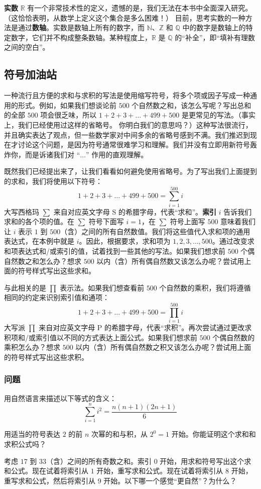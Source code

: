\textbf{实数} $\mathbb{R}$ 有一个非常技术性的定义，遗憾的是，我们无法在本书中全面深入研究。（这恰恰表明，从数学上定义这个集合是多么困难！） 目前，思考实数的一种方法是通过\textbf{数轴}。实数是数轴上所有的数字，而 $\mathbb{N}$、$\mathbb{Z}$ 和 $\mathbb{Q}$ 中的数字是数轴上的特定数字，它们并不构成整条数轴。某种程度上，$\mathbb{R}$ 是 $\mathbb{Q}$ 的“补全”，即“填补有理数之间的空白”。

\subsection{符号加油站}\label{sec:section1.3.5}

一种流行且方便的求和与求积的写法是使用缩写符号，将多个项或因子写成一种通用的形式。例如，如果我们想谈论前 $500$ 个自然数之和，该怎么写呢？写出总和的全部 $500$ 项会很乏味，所以 $1+2+3+\dots+499+500$ 是更常见的写法。（事实上，我们已经使用过这样的省略号。 你明白我们的意思吗？）这种写法很流行，并且确实表达了观点，但一些数学家对中间多余的省略号感到不满。我们推迟到现在才讨论这个问题，是因为符号通常很难学习和理解。我们并没有立即用新符号轰炸你，而是诉诸我们对 “$\dots$” 作用的直观理解。

既然我们已经提出来了，让我们看看如何避免使用省略号。为了写出我们上面提到的求和，我们将使用以下符号：
\[1+2+3+\dots+499+500 = \sum_{i=1}^{500}i\]
大写西格玛 $\sum$ 来自对应英文字母 S 的希腊字母，代表“求和”。\textbf{索引} $i$ 告诉我们求和的各个项的值。在 $\sum$ 符号下面写 $i = 1$，在 $\sum$ 符号上面写 $500$ 意味着我们让 $i$ 表示 $1$ 到 $500$（含）之间的所有自然数值。我们将这些值代入求和项的通用表达式，在本例中就是 $i$。因此，根据要求，求和项为 $1,2,3,\dots,500$。通过改变求和项表达式和/或索引的值，试着找到一些其他的写法。如果我们想求前 $500$ 个偶自然数之和怎么办？想求 $500$ 以内（含）所有偶自然数又该怎么办呢？尝试用上面的符号样式写出这些求和。

与此相关的是 $\prod$ 表示法。如果我们想查看前 $500$ 个自然数的乘积，我们将遵循相同的约定来识别索引值和通项：
\[1+2+3+\dots+499+500 = \prod_{i=1}^{500}i\]
大写派 $\prod$ 来自对应英文字母 P 的希腊字母，代表“求积”。再次尝试通过更改求积项和/或索引值以不同的方式表达上面公式。如果我们想求前 $500$ 个偶自然数的乘积怎么办？想求 $500$ 以内（含）所有偶自然数之积又该怎么办呢？尝试用上面的符号样式写出这些求积。

\subsubsection*{问题}

\begin{problem}
    用自然语言来描述以下等式的含义：
    \[\sum_{i=1}^{n}i^2 = \frac{n(n+1)(2n+1)}{6}\]
\end{problem}
\begin{problem}
    用适当的符号表达 $2$ 的前 $n$ 次幂的和与积，从 $2^0=1$ 开始。你能证明这个求和和求积公式吗？
\end{problem}
\begin{problem}
    考虑 $17$ 到 $33$（含）之间的所有奇数之和。索引 $0$ 开始，用求和符号写出这个求和公式。现在试着将索引从 $1$ 开始，重写求和公式。现在试着将索引从 $8$ 开始，重写求和公式，然后将索引从 $9$ 开始。以下哪一个感觉“更自然”？为什么？
\end{problem}
